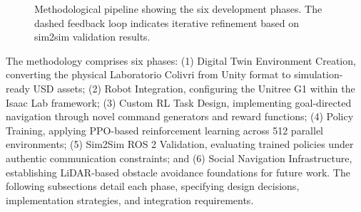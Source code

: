 \documentclass[12pt,a4paper]{article}
\begin{document}
\begin{figure}[H]
\centering
{}
\caption[Methodological pipeline overview]{Methodological pipeline showing the six development phases. The dashed feedback loop indicates iterative refinement based on sim2sim validation results.}
\label{fig:methodology_overview}
\end{figure}

The methodology comprises six phases: (1) Digital Twin Environment Creation, converting the physical Laboratorio Colivri from Unity format to simulation-ready USD assets; (2) Robot Integration, configuring the Unitree G1 within the Isaac Lab framework; (3) Custom RL Task Design, implementing goal-directed navigation through novel command generators and reward functions; (4) Policy Training, applying PPO-based reinforcement learning across 512 parallel environments; (5) Sim2Sim ROS 2 Validation, evaluating trained policies under authentic communication constraints; and (6) Social Navigation Infrastructure, establishing LiDAR-based obstacle avoidance foundations for future work. The following subsections detail each phase, specifying design decisions, implementation strategies, and integration requirements.
\end{document}
